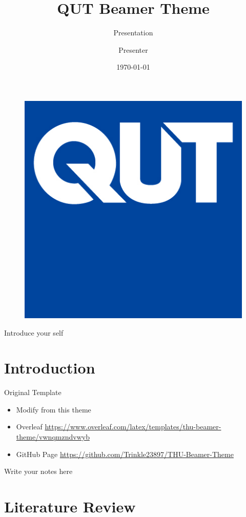 \documentclass{beamer}
\author{Presenter}
\title{QUT Beamer Theme}
\subtitle{Presentation}
\institute [School of Information Systems, QUT] {School of Information Systems\\Queensland University of Technology}
\date{\today}
\begin{document}
\begin{frame}
    \titlepage
    \begin{figure}[htpb]
        \begin{center}
            \includegraphics[width=0.2\linewidth]{pic/QUT_Logo_CMYK.jpg}
        \end{center}
    \end{figure}
    
    \begin{note}
        {Introduce your self}
    \end{note}

\end{frame}

\begin{frame}
    \tableofcontents[sectionstyle=show,subsectionstyle=show/shaded/hide,subsubsectionstyle=show/shaded/hide]
\end{frame}


\section{Introduction}

\begin{frame}{Original Template}
    \begin{itemize}[<+-| alert@+>] %
        \item Modify from this theme \cite{origin}
        \item Overleaf  \url{https://www.overleaf.com/latex/templates/thu-beamer-theme/vwnqmzndvwyb}
        \item GitHub Page \url{https://github.com/Trinkle23897/THU-Beamer-Theme}
    \end{itemize}
    
    \begin{note}
        {Write your notes here}
    \end{note}
\end{frame}



\section{Literature Review}
\end{document}
